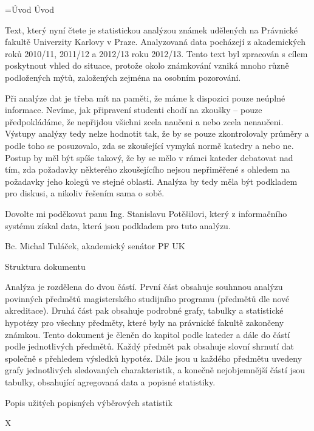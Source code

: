 \headname={Úvod}
\nonum\notoc\chap Úvod


Text, který nyní čtete je statistickou analýzou známek udělených na Právnické fakultě Univerzity Karlovy v Praze. Analyzovaná data pocházejí z akademických roků 2010/11, 2011/12 a 2012/13 roku 2012/13. Tento text byl zpracován s cílem poskytnout vhled do situace, protože okolo známkování vzniká mnoho různě podložených mýtů, založených zejména na osobním
pozorování.

Při analýze dat je třeba mít na paměti, že máme k dispozici pouze neúplné informace. Nevíme, jak připravení studenti chodí na zkoušky -- pouze předpokládáme, že nepřijdou všichni
zcela naučeni a nebo zcela nenaučeni. Výstupy analýzy tedy nelze hodnotit tak, že by se pouze zkontrolovaly průměry a podle toho se posuzovalo, zda se zkoušející vymyká 
normě katedry a nebo ne. Postup by měl být spíše takový, že by se mělo v rámci kateder debatovat nad tím, zda požadavky některého zkoušejícího nejsou nepřiměřené s ohledem
na požadavky jeho kolegů ve stejné oblasti. Analýza by tedy měla být podkladem pro diskusi, a nikoliv řešením sama o sobě.

Dovolte mi poděkovat panu Ing. Stanislavu Potěšilovi, který z informačního systému získal data, která jsou podkladem pro tuto analýzu.

\bigskip

Bc. Michal Tuláček, akademický senátor PF UK

\notoc\sec Struktura dokumentu

Analýza je rozdělena do dvou částí. První část obsahuje souhnnou analýzu povinných předmětů magisterského studijního programu (předmětů dle nové akreditace). Druhá část pak obsahuje podrobné grafy, tabulky a statistické hypotézy pro všechny předměty, které byly na právnické fakultě zakončeny známkou. Tento dokument je členěn do kapitol podle kateder a dále do částí podle jednotlivých předmětů. Každý předmět pak obsahuje slovní shrnutí dat společně s přehledem výsledků hypotéz. Dále jsou u každého 
předmětu uvedeny grafy jednotlivých sledovaných charakteristik, a konečně nejobjemnější částí jsou tabulky, obsahující agregovaná data a popisné statistiky.

\notoc\sec Popis užitých popisných výběrových statistik

\begitems \style X


